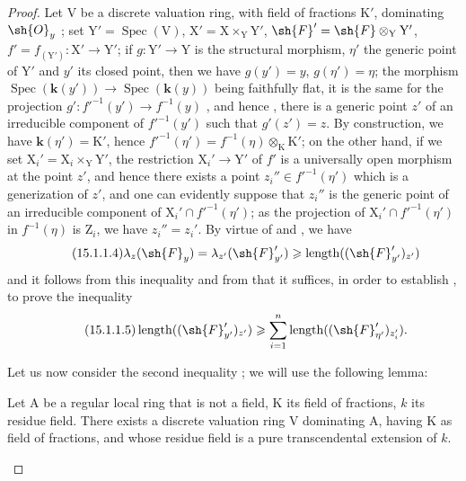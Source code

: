 \begin{proof}
Let $\mathrm{V}$ be a discrete valuation ring, with field of fractions $\mathrm{K}'$, dominating $\sh{O}_y$ ; set $\mathrm{Y}'=\operatorname{Spec}(\mathrm{V})$, $\mathrm{X}'=\mathrm{X}\times_\mathrm{Y}\mathrm{Y}'$, $\sh{F}'=\sh{F}\otimes_\mathrm{Y}\mathrm{Y}'$, $f'=f_{(\mathrm{Y}')}:\mathrm{X}'\to\mathrm{Y}'$; if $g:\mathrm{Y}'\to\mathrm{Y}$ is the structural morphism, $\eta'$ the generic point of $\mathrm{Y}'$ and $y'$ its closed point, then we have $g(y')=y$, $g(\eta')=\eta$; the morphism $\operatorname{Spec}(\mathbf{k}(y'))\to\operatorname{Spec}(\mathbf{k}(y))$ being faithfully flat, it is the same for the projection $g':f'^{-1}(y')\to f^{-1}(y)$ , and hence , there is a generic point $z'$ of an irreducible component of $f'^{-1}(y')$ such that $g'(z')=z$.
By construction, we have $\mathbf{k}(\eta')=\mathrm{K}'$, hence $f'^{-1}(\eta')=f^{-1}(\eta)\otimes_\mathrm{K}\mathrm{K}'$; on the other hand, if we set $\mathrm{X}_i'=\mathrm{X}_i\times_\mathrm{Y}\mathrm{Y}'$, the restriction $\mathrm{X}_i'\to\mathrm{Y}'$ of $f'$ is a universally open morphism at the point $z'$, and hence  there exists a point $z_i''\in f'^{-1}(\eta')$ which is a generization of $z'$, and one can evidently suppose that $z_i''$ is the generic point of an irreducible component of $\mathrm{X}_i'\cap f'^{-1}(\eta')$; as the projection of $\mathrm{X}_i'\cap f'^{-1}(\eta')$ in $f^{-1}(\eta)$ is $\mathrm{Z}_i$, we have $z_i''=z_i'$.
By virtue of  and , we have
\[
\tag{15.1.1.4}
\label{IV.15.1.1.4}
  \lambda_z(\sh{F}_y)=\lambda_{z'}(\sh{F}'_{y'})\geqslant\operatorname{length}((\sh{F}'_{y'})_{z'})
\]
and it follows from this inequality and from  that it suffices, in order to establish , to prove the inequality
\[
\tag{15.1.1.5}
\label{IV.15.1.1.5}
  \operatorname{length}((\sh{F}_{y'}')_{z'})\geqslant\sum_{i=1}^{n}\operatorname{length}((\sh{F}_{\eta'}')_{z_i'}).
\]

Let us now consider the second inequality ; we will use the following lemma:

\begin{lemma}[15.1.1.6]
\label{IV.15.1.1.6}
Let $\mathrm{A}$ be a regular local ring that is not a field, $\mathrm{K}$ its field of fractions, $k$ its residue field.
There exists a discrete valuation ring $\mathrm{V}$ dominating $\mathrm{A}$, having $\mathrm{K}$ as field of fractions, and whose residue field is a pure transcendental extension of $k$.
\end{lemma}


\end{proof}
